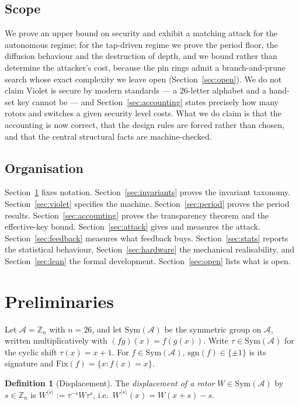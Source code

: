 \documentclass[11pt]{article}
\theoremstyle{definition}
\newtheorem{definition}[theorem]{Definition}
\newcommand{\Sym}{\mathrm{Sym}}
\newcommand{\sgn}{\mathrm{sgn}}
\newcommand{\Fix}{\mathrm{Fix}}
\newcommand{\ZZ}{\mathbb{Z}}
\begin{document}
\subsection{Scope}

We prove an upper bound on security and exhibit a matching attack for the
autonomous regime; for the tap-driven regime we prove the period floor, the
diffusion behaviour and the destruction of depth, and we bound rather than
determine the attacker's cost, because the pin rings admit a branch-and-prune
search whose exact complexity we leave open (Section~\ref{sec:open}). We do not
claim Violet is secure by modern standards --- a $26$-letter alphabet and a
hand-set key cannot be --- and Section~\ref{sec:accounting} states precisely how
many rotors and switches a given security level costs. What we do claim is that
the accounting is now correct, that the design rules are forced rather than
chosen, and that the central structural facts are machine-checked.

\subsection{Organisation}

Section~\ref{sec:prelim} fixes notation. Section~\ref{sec:invariants} proves the
invariant taxonomy. Section~\ref{sec:violet} specifies the machine.
Section~\ref{sec:period} proves the period results. Section~\ref{sec:accounting}
proves the transparency theorem and the effective-key bound.
Section~\ref{sec:attack} gives and measures the attack. Section~\ref{sec:feedback}
measures what feedback buys. Section~\ref{sec:stats} reports the statistical
behaviour, Section~\ref{sec:hardware} the mechanical realisability, and
Section~\ref{sec:lean} the formal development. Section~\ref{sec:open} lists what
is open.

\section{Preliminaries}\label{sec:prelim}

Let $\mathcal{A} = \ZZ_n$ with $n = 26$, and let $\Sym(\mathcal{A})$ be the
symmetric group on $\mathcal{A}$, written multiplicatively with $(fg)(x) =
f(g(x))$. Write $\tau \in \Sym(\mathcal{A})$ for the cyclic shift $\tau(x) = x+1$.
For $f \in \Sym(\mathcal{A})$, $\sgn(f) \in \{\pm 1\}$ is its signature and
$\Fix(f) = \{x : f(x) = x\}$.

\begin{definition}[Displacement]
The \emph{displacement of a rotor} $W \in \Sym(\mathcal{A})$ by $s \in \ZZ_n$ is
$W^{\langle s\rangle} := \tau^{-s} W \tau^{s}$, i.e.\ $W^{\langle
s\rangle}(x) = W(x+s) - s$.
\end{definition}
\end{document}
